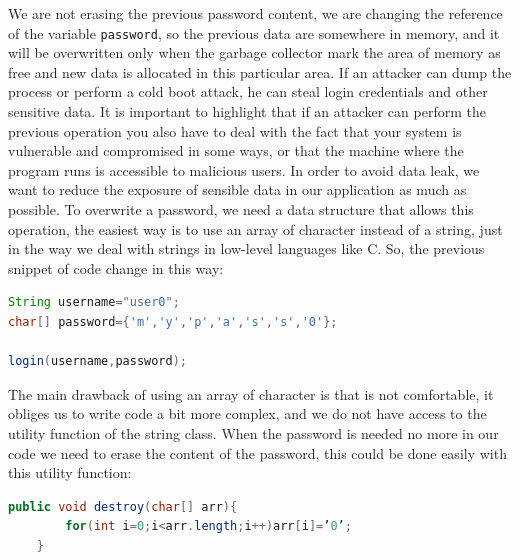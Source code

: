 We are not erasing the previous password content, we are changing the reference of the variable \texttt{password}, so the previous data are somewhere in memory, and it will be overwritten only when the garbage collector mark the area of memory as free and new data is allocated in this particular area.\newline
If an attacker can dump the process or perform a cold boot attack, he can steal login credentials and other sensitive data.
It is important to highlight that if an attacker can perform the previous operation you also have to deal with the fact that your system is vulnerable and compromised in some ways, or that the machine where the program runs is accessible to malicious users.\newline
In order to avoid data leak, we want to reduce the exposure of sensible data in our application as much as possible.\newline
To overwrite a password, we need a data structure that allows this operation, the easiest way is to use an array of character instead of a string, just in the way we deal with strings in low-level languages like C.\newline
So, the previous snippet of code change in this way:
\begin{lstlisting}[language=Java]
String username="user0";
char[] password={'m','y','p','a','s','s','0'};

login(username,password);
\end{lstlisting}


The main drawback of using an array of character is that is not comfortable, it obliges us to write code a bit more complex, and we do not have access to the utility function of the string class.
When the password is needed no more in our code we need to erase the content of the password, this could be done easily with this utility function:
\begin{lstlisting}[language=Java]
	public void destroy(char[] arr){
		for(int i=0;i<arr.length;i++)arr[i]=’0’;
	}
\end{lstlisting}

